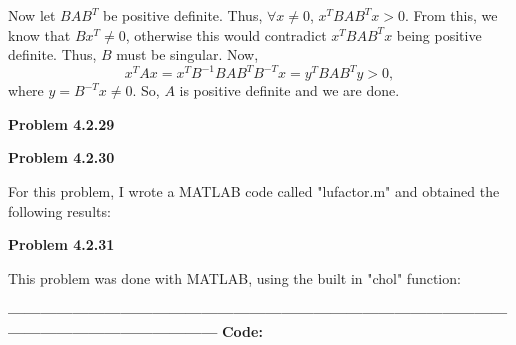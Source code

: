\documentclass{article}
\newcommand{\Problem}[1]{\textbf{Problem #1}}
\begin{document}
Now let $BAB^T$ be positive definite. Thus, $\forall x \neq 0$, $x^TBAB^Tx > 0$. From this, we know that $Bx^T \neq 0$, otherwise this would contradict $x^TBAB^Tx$ being positive definite. Thus, $B$ must be singular. Now, 
\begin{equation*}
x^TAx = x^TB^{-1}BAB^TB^{-T}x = y^TBAB^Ty > 0	,
\end{equation*}
where $y = B^{-T}x \neq 0$. So, $A$ is positive definite and we are done. 

\Problem{4.2.29}



\Problem{4.2.30}

For this problem, I wrote a MATLAB code called "lufactor.m" and obtained the following results:

\Problem{4.2.31}

This problem was done with MATLAB, using the built in "chol" function:

\textbf{------------------------------------------------------------------------------------------------------------------------------------}
\textbf{Code:}

\end{document}
